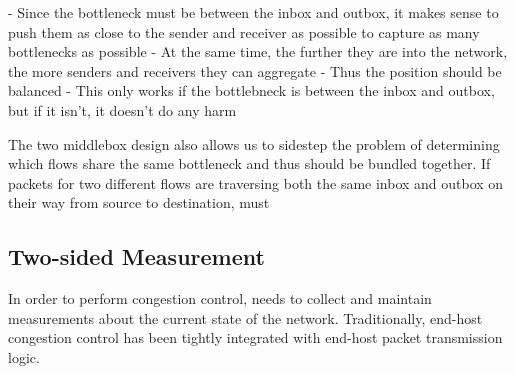 {- Since the bottleneck must be between the inbox and outbox, it makes sense to push them as 
close to the sender and receiver as possible to capture as many bottlenecks as possible
- At the same time, the further they are into the network, the more senders and receivers they
can aggregate
- Thus the position should be balanced
- This only works if the bottlebneck is between the inbox and outbox, but if it isn't, it doesn't do any harm

The two middlebox design also allows us to sidestep the problem of determining which flows share
the same bottleneck and thus should be bundled together.  If packets for two different flows are traversing
both the same inbox and outbox on their way from source to destination, 
must 
}

\subsection{Two-sided Measurement}\label{s:design:twosided}
In order to perform congestion control, \name needs to collect and maintain measurements about the current state of the network. Traditionally, end-host congestion control has been tightly integrated with end-host packet transmission logic.
